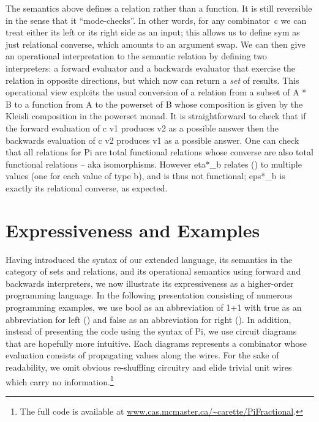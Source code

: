 \documentclass[preprint]{sigplanconf}
\begin{document}
The semantics above defines a relation rather than a function. It is still
reversible in the sense that it ``mode-checks''. In other words, for any
combinator~{{c}} we can treat either its left or its right side as an input;
this allows us to define {{sym}} as just relational converse, which amounts
to an argument swap. We can then give an operational interpretation to the
semantic relation by defining two interpreters: a forward evaluator and a
backwards evaluator that exercise the relation in opposite directions, but
which now can return a \emph{set} of results. This operational view exploits
the usual conversion of a relation from a subset of {{A * B}} to a function
from {{A}} to the powerset of {{B}} whose composition is given by the Kleisli
composition in the powerset monad. It is straightforward to check that if the
forward evaluation of {{c v1}} produces {{v2}} as a possible answer then the
backwards evaluation of {{c v2}} produces {{v1}} as a possible answer.  One
can check that all relations for {{Pi}} are total functional relations whose
converse are also total functional relations -- aka isomorphisms.  However
{{eta*_b}} relates {{()}} to multiple values (one for each value of type {{b}}),
and is thus not functional; {{eps*_b}} is exactly its relational converse, as
expected.


\section{Expressiveness and Examples} 

Having introduced the syntax of our extended language, its semantics in the
category of sets and relations, and its operational semantics using forward
and backwards interpreters, we now illustrate its expressiveness as a
higher-order programming language. In the following presentation consisting
of numerous programming examples, we use {{bool}} as an abbreviation of
{{1+1}} with {{true}} as an abbreviation for {{left ()}} and {{false}} as an
abbreviation for {{right ()}}. In addition, instead of presenting the code
using the syntax of {{Pi}}, we use circuit diagrams that are hopefully more
intuitive. Each diagrams represents a combinator whose evaluation consists of
propagating values along the wires.  For the sake of readability, we omit
obvious re-shuffling circuitry and elide trivial unit wires which carry no
information.\footnote{The full code is available at
\url{www.cas.mcmaster.ca/~carette/PiFractional}.}
\end{document}
